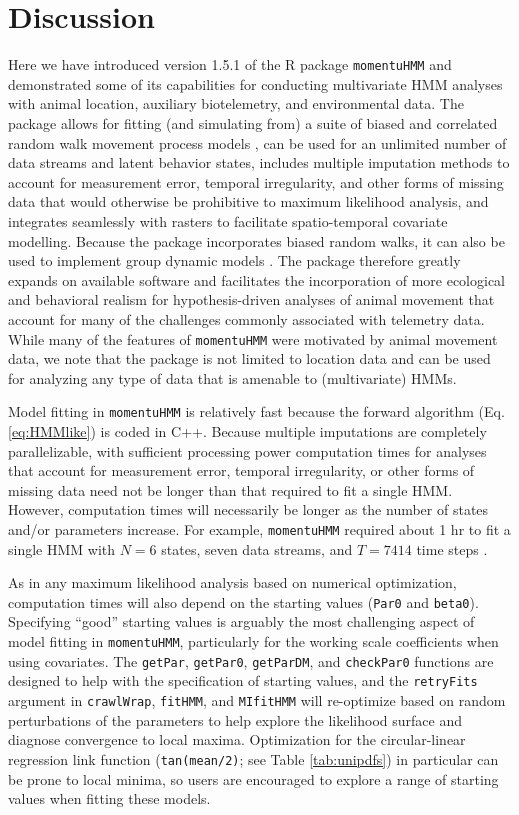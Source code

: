\documentclass[12pt]{article}\usepackage[]{graphicx}\usepackage[]{color}
\begin{document}
\section{Discussion}
Here we have introduced version 1.5.1 of the R package \verb|momentuHMM| and demonstrated some of its capabilities for conducting multivariate HMM analyses with animal location, auxiliary biotelemetry, and environmental data. The package allows for fitting (and simulating from) a suite of biased and correlated random walk movement process models \citep[e.g.][]{McClintockEtAl2012}, can be used for an unlimited number of data streams and latent behavior states, includes multiple imputation methods to account for measurement error, temporal irregularity, and other forms of missing data that would otherwise be prohibitive to maximum likelihood analysis, and integrates seamlessly with rasters to facilitate spatio-temporal covariate modelling. Because the package incorporates biased random walks, it can also be used to implement group dynamic models \cite[e.g.][]{LangrockEtAl2014}. The package therefore greatly expands on available software and facilitates the incorporation of more ecological and behavioral realism for hypothesis-driven analyses of animal movement that account for many of the challenges commonly associated with telemetry data. While many of the features of \verb|momentuHMM| were motivated by animal movement data, we note that the package is not limited to location data and can be used for analyzing any type of data that is amenable to (multivariate) HMMs.

Model fitting in \verb|momentuHMM| is relatively fast because the forward algorithm (Eq. \ref{eq:HMMlike}) is coded in C++. Because multiple imputations are completely parallelizable, with sufficient processing power computation times for analyses that account for measurement error, temporal irregularity, or other forms of missing data need not be longer than that required to fit a single HMM.  However, computation times will necessarily be longer as the number of states and/or parameters increase. For example, \verb|momentuHMM| required about 1 hr to fit a single HMM with $N=6$ states, seven data streams, and $T=7414$ time steps \citep{McClintock2017}. 

As in any maximum likelihood analysis based on numerical optimization, computation times will also depend on the starting values (\verb|Par0| and \verb|beta0|). Specifying ``good'' starting values is arguably the most challenging aspect of model fitting in \verb|momentuHMM|, particularly for the working scale coefficients when using covariates. The \verb|getPar|, \verb|getPar0|, \verb|getParDM|, and \verb|checkPar0| functions are designed to help with the specification of starting values, and the \verb|retryFits| argument in \verb|crawlWrap|, \verb|fitHMM|, and \verb|MIfitHMM| will re-optimize based on random perturbations of the parameters to help explore the likelihood surface and diagnose convergence to local maxima. Optimization for the circular-linear regression link function (\verb|tan(mean/2)|; see Table \ref{tab:unipdfs}) in particular can be prone to local minima, so users are encouraged to explore a range of starting values when fitting these models.
\end{document}
